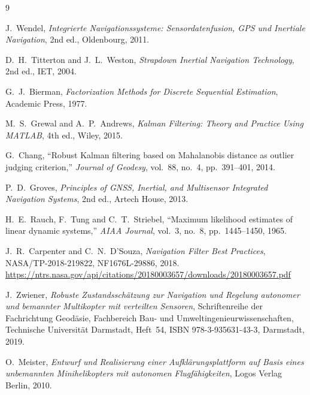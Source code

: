 \documentclass[11pt,a4paper]{article}
\begin{document}
\begin{thebibliography}{9}

J.~Wendel,
\emph{Integrierte Navigationssysteme: Sensordatenfusion, GPS und
Inertiale Navigation}, 2nd ed., Oldenbourg, 2011.

D.~H.~Titterton and J.~L.~Weston,
\emph{Strapdown Inertial Navigation Technology}, 2nd ed., IET, 2004.

G.~J.~Bierman,
\emph{Factorization Methods for Discrete Sequential Estimation},
Academic Press, 1977.

M.~S.~Grewal and A.~P.~Andrews,
\emph{Kalman Filtering: Theory and Practice Using MATLAB}, 4th ed.,
Wiley, 2015.

G.~Chang,
``Robust Kalman filtering based on Mahalanobis distance as outlier
judging criterion,''
\emph{Journal of Geodesy}, vol.~88, no.~4, pp.~391--401, 2014.

P.~D.~Groves,
\emph{Principles of GNSS, Inertial, and Multisensor Integrated
Navigation Systems}, 2nd ed., Artech House, 2013.

H.~E.~Rauch, F.~Tung and C.~T.~Striebel,
``Maximum likelihood estimates of linear dynamic systems,''
\emph{AIAA Journal}, vol.~3, no.~8, pp.~1445--1450, 1965.

J.~R.~Carpenter and C.~N.~D'Souza,
\emph{Navigation Filter Best Practices}, NASA/TP-2018-219822,
NF1676L-29886, 2018.
\url{https://ntrs.nasa.gov/api/citations/20180003657/downloads/20180003657.pdf}

J.~Zwiener,
\emph{Robuste Zustandssch\"atzung zur Navigation und Regelung autonomer und
bemannter Multikopter mit verteilten Sensoren}, Schriftenreihe der
Fachrichtung Geod\"asie, Fachbereich Bau- und Umweltingenieurwissenschaften,
Technische Universit\"at Darmstadt, Heft~54, ISBN 978-3-935631-43-3,
Darmstadt, 2019.

O.~Meister,
\emph{Entwurf und Realisierung einer Aufkl\"arungsplattform auf Basis eines
unbemannten Minihelikopters mit autonomen Flugf\"ahigkeiten},
Logos Verlag Berlin, 2010.

\end{thebibliography}
\end{document}

